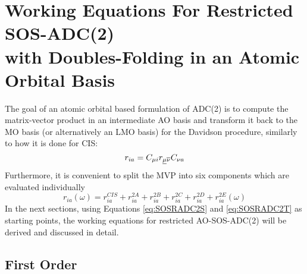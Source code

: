 \section[Working Equations For Restricted AO-SOS-ADC(2)]{Working Equations For Restricted SOS-ADC(2) \\ with Doubles-Folding in an Atomic Orbital Basis}

The goal of an atomic orbital based formulation of ADC(2) is to compute the matrix-vector product in an intermediate AO basis and transform it back to the MO basis (or alternatively an LMO basis) for the Davidson procedure, similarly to how it is done for CIS:
\begin{equation}
r_{ia} = C_{\mu i} r_{\underline{\mu} \overline{\nu}} C_{\nu a}
\end{equation}
\noindent Furthermore, it is convenient to split the MVP into six components which are evaluated individually
\begin{equation}
r_{ia}(\omega) = r_{ia}^{CIS} + r_{ia}^{2A} + r_{ia}^{2B} + r_{ia}^{2C} + r_{ia}^{2D} + r_{ia}^{2E}(\omega)
\end{equation}
\noindent In the next sections, using Equations \ref{eq:SOSRADC2S} and \ref{eq:SOSRADC2T} as starting points, the working equations for restricted AO-SOS-ADC(2) will be derived and discussed in detail. 

\subsection{First Order}

